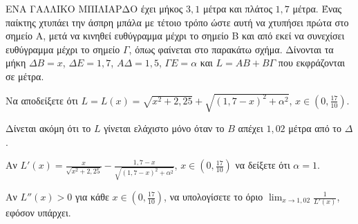 ΕΝΑ ΓΑΛΛΙΚΟ ΜΠΙΛΙΑΡΔΟ έχει μήκος $3,1$ μέτρα και πλάτος $1,7$ μέτρα. Ένας παίκτης χτυπάει την άσπρη μπάλα με τέτοιο τρόπο ώστε αυτή να χτυπήσει πρώτα στο σημείο Α, μετά να κινηθεί ευθύγραμμα μέχρι το σημείο Β και από εκεί να συνεχίσει ευθύγραμμα μέχρι το σημείο $\Gamma$, όπως φαίνεται στο παρακάτω σχήμα. Δίνονται τα μήκη $\Delta B = x$, $\Delta E = 1,7$, $A\Delta = 1,5$, $\Gamma E = \alpha$ και $L = AB + B\Gamma$ που εκφράζονται σε μέτρα.

\begin{alist}
    \item Να αποδείξετε ότι $L = L(x) = \sqrt{x^2 + 2,25} + \sqrt{(1,7-x)^2 + \alpha^2}$, $x \in \left(0, \frac{17}{10}\right)$. 
    \item Δίνεται ακόμη ότι το $L$ γίνεται ελάχιστο μόνο όταν το $B$ απέχει $1,02$ μέτρα από το $\Delta$.
    \begin{rlist}
        \item Αν $L'(x) = \frac{x}{\sqrt{x^2 + 2,25}} - \frac{1,7-x}{\sqrt{(1,7-x)^2 + \alpha^2}}$, $x \in \left(0, \frac{17}{10}\right)$ να δείξετε ότι $\alpha = 1$. 
        \item Αν $L''(x) > 0$ για κάθε $x \in \left(0, \frac{17}{10}\right)$, να υπολογίσετε το όριο $\lim_{x \to 1,02} \frac{1}{L'(x)}$, εφόσον υπάρχει. 
    \end{rlist}
\end{alist}